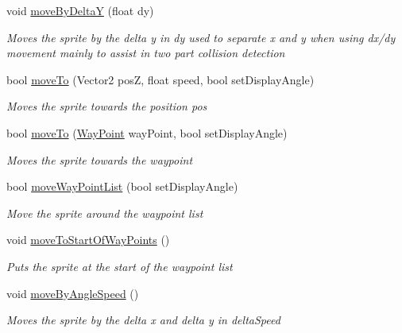 \begin{DoxyCompactItemize}
void \mbox{\hyperlink{class_r_c___framework_1_1_sprite3_a1f6400b76f55f9714cbbba19db329aa0}{move\+By\+DeltaY}} (float dy)
\begin{DoxyCompactList}\small\item\em Moves the sprite by the delta y in dy used to separate x and y when using dx/dy movement mainly to assist in two part collision detection \end{DoxyCompactList}\item 
bool \mbox{\hyperlink{class_r_c___framework_1_1_sprite3_abe2751690c88083e769e0742f6707fc8}{move\+To}} (Vector2 posZ, float speed, bool set\+Display\+Angle)
\begin{DoxyCompactList}\small\item\em Moves the sprite towards the position pos \end{DoxyCompactList}\item 
bool \mbox{\hyperlink{class_r_c___framework_1_1_sprite3_ad9e41fed1c73323a3375173c9be541be}{move\+To}} (\mbox{\hyperlink{class_r_c___framework_1_1_way_point}{Way\+Point}} way\+Point, bool set\+Display\+Angle)
\begin{DoxyCompactList}\small\item\em Moves the sprite towards the waypoint \end{DoxyCompactList}\item 
bool \mbox{\hyperlink{class_r_c___framework_1_1_sprite3_a7f4a44725a3873c534b0466b7b49a990}{move\+Way\+Point\+List}} (bool set\+Display\+Angle)
\begin{DoxyCompactList}\small\item\em Move the sprite around the waypoint list \end{DoxyCompactList}\item 
void \mbox{\hyperlink{class_r_c___framework_1_1_sprite3_a0dc780cf6c8438ad43880143e9e273c1}{move\+To\+Start\+Of\+Way\+Points}} ()
\begin{DoxyCompactList}\small\item\em Puts the sprite at the start of the waypoint list \end{DoxyCompactList}\item 
void \mbox{\hyperlink{class_r_c___framework_1_1_sprite3_a8566054426bf9eb7093c101a2c26407e}{move\+By\+Angle\+Speed}} ()
\begin{DoxyCompactList}\small\item\em Moves the sprite by the delta x and delta y in delta\+Speed \end{DoxyCompactList}\item 

\end{DoxyCompactItemize}
